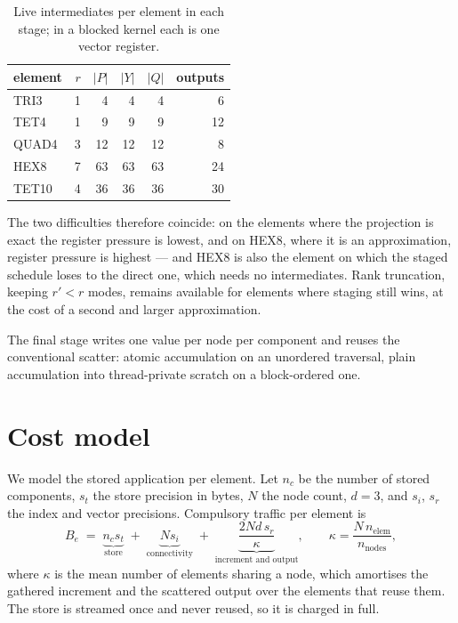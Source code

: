 \documentclass[11pt]{article}
\begin{document}
\begin{table}[ht]
\centering
\begin{tabular}{lrrrrr}
\toprule
element & $r$ & $|P|$ & $|Y|$ & $|Q|$ & outputs \\
\midrule
TRI3  & 1 &  4 &  4 &  4 &  6 \\
TET4  & 1 &  9 &  9 &  9 & 12 \\
QUAD4 & 3 & 12 & 12 & 12 &  8 \\
HEX8  & 7 & 63 & 63 & 63 & 24 \\
TET10 & 4 & 36 & 36 & 36 & 30 \\
\bottomrule
\end{tabular}
\caption{Live intermediates per element in each stage; in a blocked kernel each
is one vector register.}
\label{tab:stages}
\end{table}

The two difficulties therefore coincide: on the elements where the projection is
exact the register pressure is lowest, and on HEX8, where it is an
approximation, register pressure is highest --- and HEX8 is also the element on
which the staged schedule loses to the direct one, which needs no intermediates.
Rank truncation, keeping $r' < r$ modes, remains available for elements where
staging still wins, at the cost of a second and larger approximation.

The final stage writes one value per node per component and reuses the
conventional scatter: atomic accumulation on an unordered traversal, plain
accumulation into thread-private scratch on a block-ordered one.

\section{Cost model}
\label{sec:model}

We model the stored application per element.  Let $n_c$ be the number of stored
components, $s_t$ the store precision in bytes, $N$ the node count, $d = 3$, and
$s_i$, $s_r$ the index and vector precisions.  Compulsory traffic per element is
\begin{equation}
  B_e \;=\; \underbrace{n_c s_t}_{\text{store}}
        \;+\; \underbrace{N s_i}_{\text{connectivity}}
        \;+\; \underbrace{\frac{2 N d\, s_r}{\kappa}}_{\text{increment and output}} ,
  \qquad
  \kappa = \frac{N\, n_{\mathrm{elem}}}{n_{\mathrm{nodes}}} ,
  \label{eq:bytes}
\end{equation}
where $\kappa$ is the mean number of elements sharing a node, which amortises the
gathered increment and the scattered output over the elements that reuse them.
The store is streamed once and never reused, so it is charged in full.
\end{document}
